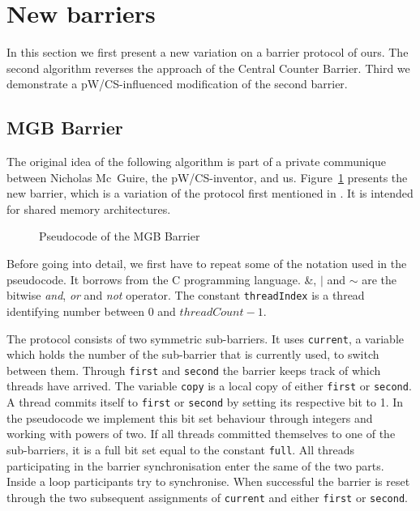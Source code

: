 \documentclass[a4paper, 10pt]{article}
\begin{document}
\section{New barriers}
\label{sec:new}
In this section we first present a new variation on a barrier protocol of ours. The second algorithm reverses the approach of the Central Counter Barrier. Third we demonstrate a pW/CS-influenced modification of the second barrier.

\subsection{MGB Barrier}
\label{ssec:new-mgb}
The original idea of the following algorithm is part of a private communique between Nicholas Mc~Guire, the pW/CS-inventor, and us. Figure~\ref{fig:pseudocode-mgb} presents the new barrier, which is a variation of the protocol first mentioned in \cite{bre13}. It is intended for shared memory architectures.

\begin{figure}[htbp]
	\centering
	
	\caption{Pseudocode of the MGB Barrier}
	\label{fig:pseudocode-mgb}
\end{figure}

Before going into detail, we first have to repeat some of the notation used in the pseudocode. It borrows from the C programming language. \&, $|$ and $\sim$ are the bitwise \emph{and}, \emph{or} and \emph{not} operator. The constant \texttt{threadIndex} is a thread identifying number between 0 and $\mathit{threadCount}-1$.

The protocol consists of two symmetric sub-barriers. It uses \texttt{current}, a variable which holds the number of the sub-barrier that is currently used, to switch between them.
Through \texttt{first} and \texttt{second} the barrier keeps track of which threads have arrived.
The variable \texttt{copy} is a local copy of either \texttt{first} or \texttt{second}.
A thread commits itself to \texttt{first} or \texttt{second} by setting its respective bit to 1. In the pseudocode we implement this bit set behaviour through integers and working with powers of two. If all threads committed themselves to one of the sub-barriers, it is a full bit set equal to the constant \texttt{full}.
All threads participating in the barrier synchronisation enter the same of the two parts.
Inside a loop participants try to synchronise. When successful the barrier is reset through the two subsequent assignments of \texttt{current} and either \texttt{first} or \texttt{second}.
\end{document}
